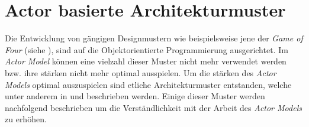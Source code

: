 \section{Actor basierte Architekturmuster}\label{sec:theory:actorArchitecture}
Die Entwicklung von gängigen Designmustern wie beispielsweise jene der \textit{Game of Four} (siehe \cite{gangOfFour1995design}), sind auf die Objektorientierte Programmierung ausgerichtet. Im \textit{Actor Model} können eine vielzahl dieser Muster nicht mehr verwendet werden bzw. ihre stärken nicht mehr optimal ausspielen. Um die stärken des \textit{Actor Models} optimal auszuspielen sind etliche Architekturmuster entstanden, welche unter anderem in \cite{Vernon2015ReactiveAkka} und \cite{kuhn2017reactive} beschrieben werden. Einige dieser Muster werden nachfolgend beschrieben um die Verständlichkeit mit der Arbeit des \textit{Actor Models} zu erhöhen.

